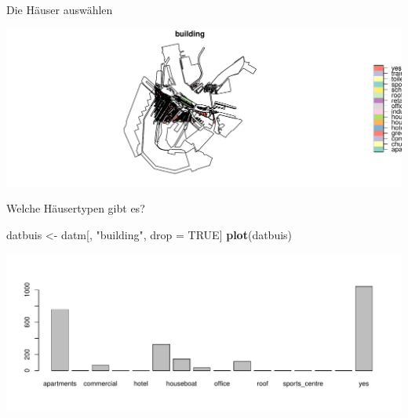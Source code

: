 \documentclass[ignorenonframetext,]{beamer}
\newenvironment{Shaded}{\begin{snugshade}}{\end{snugshade}}
\newcommand{\KeywordTok}[1]{\textcolor[rgb]{0.13,0.29,0.53}{\textbf{#1}}}
\newcommand{\StringTok}[1]{\textcolor[rgb]{0.31,0.60,0.02}{#1}}
\newcommand{\OtherTok}[1]{\textcolor[rgb]{0.56,0.35,0.01}{#1}}
\newcommand{\OperatorTok}[1]{\textcolor[rgb]{0.81,0.36,0.00}{\textbf{#1}}}
\newcommand{\NormalTok}[1]{#1}
\begin{document}
\begin{frame}[fragile]{Die Häuser auswählen}

\begin{Shaded}
\end{Shaded}

\includegraphics{slides_all2gether_part2_files/figure-beamer/unnamed-chunk-198-1.pdf}

\end{frame}

\begin{frame}[fragile]{Welche Häusertypen gibt es?}

\begin{Shaded}
\end{Shaded}

\begin{Shaded}
\begin{Highlighting}[]
\NormalTok{datbuis <-}\StringTok{ }\NormalTok{datm[, }\StringTok{"building"}\NormalTok{, drop =}\StringTok{ }\OtherTok{TRUE}\NormalTok{]}
\KeywordTok{plot}\NormalTok{(datbuis)}
\end{Highlighting}
\end{Shaded}

\includegraphics{slides_all2gether_part2_files/figure-beamer/unnamed-chunk-200-1.pdf}

\end{frame}
\end{document}
